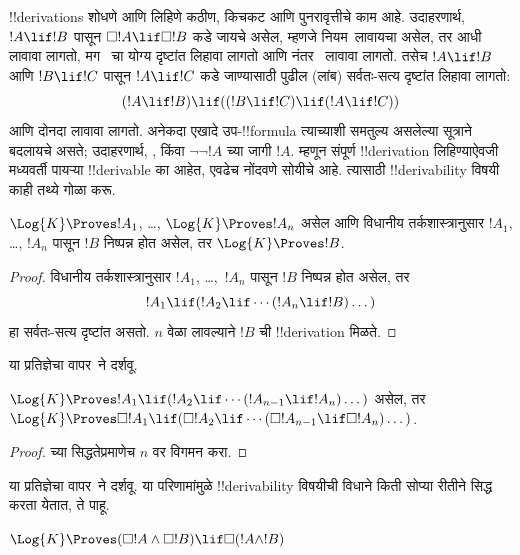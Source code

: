 \documentclass[../../../include/open-logic-section]{subfiles}
\begin{document}


!!{derivation}s शोधणे आणि लिहिणे कठीण, किचकट
आणि पुनरावृत्तीचे काम आहे. उदाहरणार्थ, $!A \lif !B$
पासून $\Box !A \lif \Box !B$ कडे जायचे असेल,
म्हणजे नियम~\RK लावायचा असेल, तर आधी \Nec लावावा लागतो,
मग~ चा योग्य दृष्टांत लिहावा लागतो आणि नंतर~\MP
लावावा लागतो. तसेच $!A \lif !B$ आणि $!B \lif !C$
पासून $!A \lif !C$ कडे जाण्यासाठी पुढील (लांब)
सर्वतः-सत्य दृष्टांत लिहावा लागतो:
\[
(!A \lif !B) \lif ((!B \lif !C) \lif (!A \lif !C))
\]
आणि \MP{} दोनदा लावावा लागतो. अनेकदा एखादे उप-!!{formula}
त्याच्याशी समतुल्य असलेल्या सूत्राने बदलायचे असते;
उदाहरणार्थ, , किंवा
$\lnot\lnot !A$ च्या जागी $!A$. म्हणून संपूर्ण
!!{derivation} लिहिण्याऐवजी मध्यवर्ती पायऱ्या
!!{derivable} का आहेत, एवढेच नोंदवणे सोयीचे आहे.
त्यासाठी !!{derivability} विषयी काही तथ्ये गोळा करू.

\begin{prop}
  $\Log{K} \Proves !A_1$, \dots, $\Log{K} \Proves !A_n$
  असेल आणि विधानीय तर्कशास्त्रानुसार $!A_1$, \dots,
  $!A_n$ पासून $!B$ निष्पन्न होत असेल, तर
  $\Log{K} \Proves !B$.
\end{prop}

\begin{proof}
  विधानीय तर्कशास्त्रानुसार $!A_1$, \dots,~$!A_n$
  पासून $!B$ निष्पन्न होत असेल, तर
  \[
  !A_1 \lif (!A_2 \lif \cdots (!A_n \lif !B)\dots)
  \]
  हा सर्वतः-सत्य दृष्टांत असतो. \MP{} $n$ वेळा
  लावल्याने $!B$ ची !!{derivation} मिळते.
\end{proof}

या प्रतिज्ञेचा वापर~\PL ने दर्शवू.

\begin{prop}
  $\Log{K} \Proves !A_1 \lif (!A_2 \lif \cdots (!A_{n-1} \lif
  !A_n)\dots)$ असेल, तर $\Log{K} \Proves \Box !A_1 \lif (\Box !A_2 \lif
  \cdots (\Box !A_{n-1} \lif \Box !A_n)\dots)$.
\end{prop}

\begin{proof}
   च्या सिद्धतेप्रमाणेच
  $n$ वर विगमन करा.
\end{proof}

या प्रतिज्ञेचा वापर~\RK ने दर्शवू. या परिणामांमुळे
!!{derivability} विषयीची विधाने किती सोप्या
रीतीने सिद्ध करता येतात, ते पाहू.

\begin{prop}
  $\Log{K} \Proves (\Box!A \land \Box!B) \lif \Box (!A \land !B)$
\end{prop}
\end{document}
